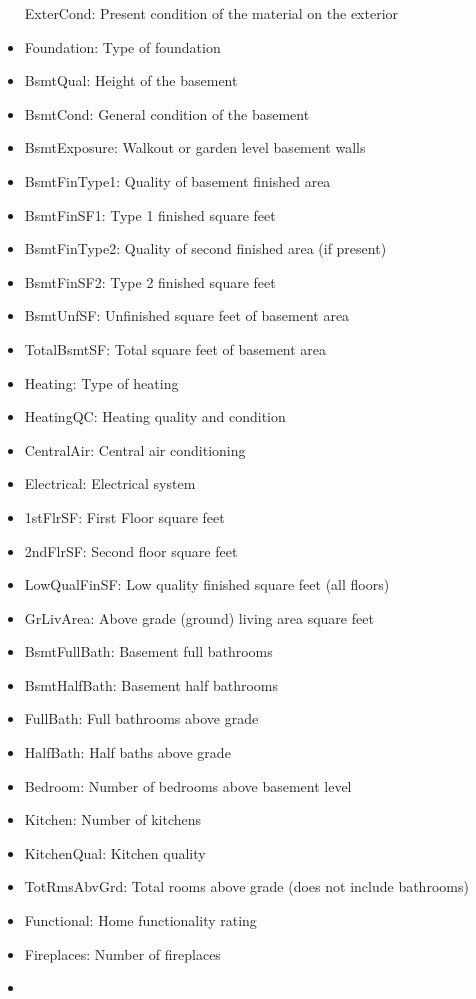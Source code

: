 \documentclass[11pt]{article}
\begin{document}
\begin{itemize}
  ExterCond: Present condition of the material on the exterior
\item
  Foundation: Type of foundation
\item
  BsmtQual: Height of the basement
\item
  BsmtCond: General condition of the basement
\item
  BsmtExposure: Walkout or garden level basement walls
\item
  BsmtFinType1: Quality of basement finished area
\item
  BsmtFinSF1: Type 1 finished square feet
\item
  BsmtFinType2: Quality of second finished area (if present)
\item
  BsmtFinSF2: Type 2 finished square feet
\item
  BsmtUnfSF: Unfinished square feet of basement area
\item
  TotalBsmtSF: Total square feet of basement area
\item
  Heating: Type of heating
\item
  HeatingQC: Heating quality and condition
\item
  CentralAir: Central air conditioning
\item
  Electrical: Electrical system
\item
  1stFlrSF: First Floor square feet
\item
  2ndFlrSF: Second floor square feet
\item
  LowQualFinSF: Low quality finished square feet (all floors)
\item
  GrLivArea: Above grade (ground) living area square feet
\item
  BsmtFullBath: Basement full bathrooms
\item
  BsmtHalfBath: Basement half bathrooms
\item
  FullBath: Full bathrooms above grade
\item
  HalfBath: Half baths above grade
\item
  Bedroom: Number of bedrooms above basement level
\item
  Kitchen: Number of kitchens
\item
  KitchenQual: Kitchen quality
\item
  TotRmsAbvGrd: Total rooms above grade (does not include bathrooms)
\item
  Functional: Home functionality rating
\item
  Fireplaces: Number of fireplaces
\item

\end{itemize}
\end{document}
